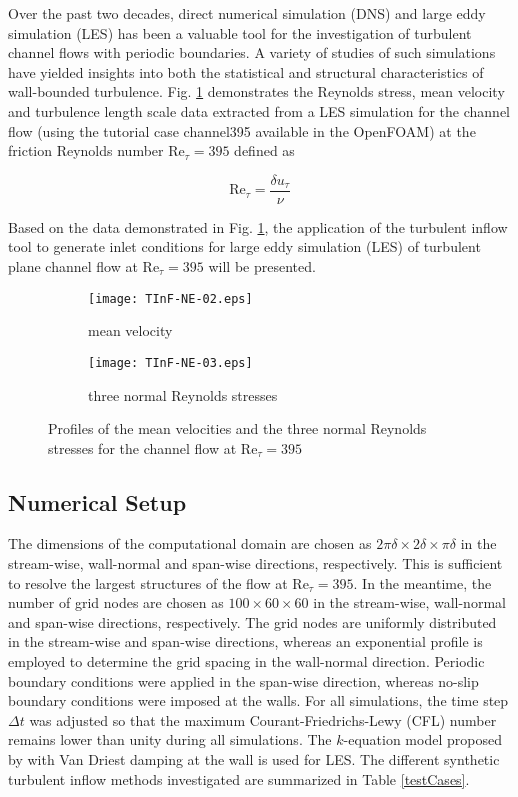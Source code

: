 Over the past two decades, direct numerical simulation (DNS) and large eddy simulation (LES) has been a valuable tool for the investigation of turbulent channel flows with periodic boundaries. A variety of studies of such simulations have yielded insights into both the statistical and structural characteristics of wall-bounded turbulence. Fig. \ref{profile} demonstrates the Reynolds stress, mean velocity and turbulence length scale data extracted from a LES simulation for the channel flow (using the tutorial case \textcolor{mauve}{channel395} available in the OpenFOAM) at the friction Reynolds number $\mathrm{Re}_{\tau} = 395$ defined as

\begin{equation}
\mathrm{Re}_{\tau} = \frac{\delta u_{\tau}}{\nu}
\end{equation}

\noindent Based on the data demonstrated in Fig. \ref{profile}, the application of the turbulent inflow tool to generate inlet conditions for large eddy simulation (LES) of turbulent plane channel flow at $\mathrm{Re}_{\tau} = 395$ will be presented.

\begin{figure}[H]
\centering
    \begin{subfigure}[b]{0.4\linewidth}
        \texttt{[image: TInF-NE-02.eps]}
        \caption{mean velocity}
     \end{subfigure}
    \begin{subfigure}[b]{0.4\linewidth}
        \texttt{[image: TInF-NE-03.eps]}
        \caption{three normal Reynolds stresses}
    \end{subfigure}
      \caption{Profiles of the mean velocities and the three normal Reynolds stresses for the channel flow at $\mathrm{Re}_{\tau} = 395$}\label{profile}
\end{figure}

\subsection{Numerical Setup}

The dimensions of the computational domain are chosen as $2\pi\delta\times 2\delta \times \pi\delta$ in the stream-wise, wall-normal and span-wise directions, respectively. This is sufficient to resolve the largest structures of the flow at $\mathrm{Re}_{\tau} = 395$. In the meantime, the number of grid nodes are chosen as $100 \times 60 \times 60$ in the stream-wise, wall-normal and span-wise directions, respectively. The grid nodes are uniformly distributed in the stream-wise and span-wise directions, whereas an exponential profile is employed to determine the grid spacing in the wall-normal direction. Periodic boundary conditions were applied in the span-wise direction, whereas no-slip boundary conditions were imposed at the walls. For all simulations, the time step $\Delta t$ was adjusted so that the maximum Courant-Friedrichs-Lewy (CFL) number remains lower than unity during all simulations. The $k$-equation model proposed by \cite{yoshizawa1986} with Van Driest damping at the wall is used for LES. The different synthetic turbulent inflow methods investigated are summarized in Table \ref{testCases}.

